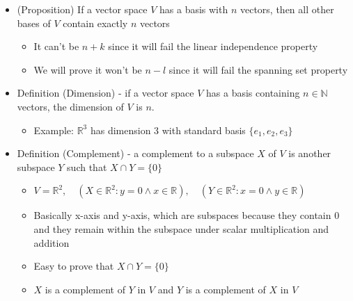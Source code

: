 \documentclass{article}
\begin{document}
\begin{itemize}
\begin{itemize}
\begin{itemize}
            \item $w_1 = x_{11}e_1 + x_{12}e_2 + x_{13}e_3$
            \item $w_2 = x_{21}e_1 + x_{22}e_2 + x_{23}e_3$
            \item $w_3 = x_{31}e_1 + x_{32}e_2 + x_{33}e_3$
            \item $w_4 = x_{41}e_1 + x_{42}e_2 + x_{43}e_3$
        \end{itemize}
        \item Write $e_1,e_2,e_3$ as linear combinations of $w_1,w_2,w_3$ (linear independence property)
        \item $w_4$ can be written as a linear combination of $w_1,w_2,w_3$, which means that $T$ is not a linearly independent set
    \end{itemize}
    \item (Proposition) If a vector space $V$ has a basis with $n$ vectors, then all other bases of $V$ contain exactly $n$ vectors
    \begin{itemize}
        \item It can't be $n+k$ since it will fail the linear independence property
        \item We will prove it won't be $n-l$ since it will fail the spanning set property
    \end{itemize}
    \item Definition (Dimension) - if a vector space $V$ has a basis containing $n \in \mathbb{N}$ vectors, the dimension of $V$ is $n$.
    \begin{itemize}
        \item Example: $\mathbb{R}^3$ has dimension 3 with standard basis $\{e_1,e_2,e_3\}$
    \end{itemize}
    \item Definition (Complement) - a complement to a subspace $X$ of $V$ is another subspace $Y$ such that $X \cap Y = \{0\}$
    \begin{itemize}
        \item $V=\mathbb{R}^2, \quad (X \in \mathbb{R}^2 : y=0 \wedge x \in \mathbb{R}), \quad (Y \in \mathbb{R}^2 : x = 0 \wedge y \in \mathbb{R})$
        \item Basically x-axis and y-axis, which are subspaces because they contain 0 and they remain within the subspace under scalar multiplication and addition
        \item Easy to prove that $X \cap Y = \{0\}$
        \item $X$ is a complement of $Y$ in $V$ and $Y$ is a complement of $X$ in $V$

\end{itemize}
\end{itemize}
\end{document}

